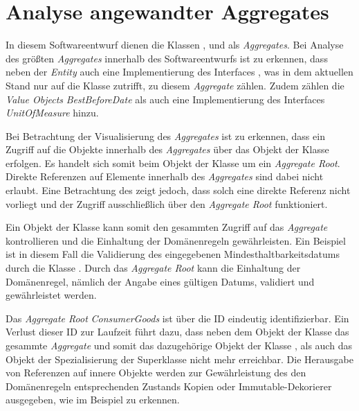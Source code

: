 \section{Analyse angewandter Aggregates}
\label{domaindrivendesign>aggregates}
In diesem Softwareentwurf dienen die Klassen \href{}{}, \href{}{} und \href{}{} als \textit{Aggregates}.
Bei Analyse des größten \textit{Aggregates} innerhalb des Softwareentwurfs ist zu erkennen, dass neben der \textit{Entity} \href{}{} auch eine Implementierung des Interfaces \href{}{}, was in dem aktuellen Stand nur auf die Klasse \href{}{} zutrifft, zu diesem \textit{Aggregate} zählen. 
Zudem zählen die \textit{Value Objects} \textit{BestBeforeDate} als auch eine Implementierung des Interfaces \textit{UnitOfMeasure} hinzu.


Bei Betrachtung der Visualisierung des \textit{Aggregates} ist zu erkennen, dass ein Zugriff auf die Objekte innerhalb des \textit{Aggregates} über das Objekt der Klasse \href{}{} erfolgen.
Es handelt sich somit beim Objekt der Klasse \href{}{} um ein \textit{Aggregate Root}.
Direkte Referenzen auf Elemente innerhalb des \textit{Aggregates} sind dabei nicht erlaubt.
Eine Betrachtung des \href{}{} zeigt jedoch, dass solch eine direkte Referenz nicht vorliegt und der Zugriff ausschließlich über den \textit{Aggregate Root} funktioniert.

Ein Objekt der Klasse \href{}{} kann somit den gesammten Zugriff auf das \textit{Aggregate} kontrollieren und die Einhaltung der Domänenregeln gewährleisten.
Ein Beispiel ist in diesem Fall die Validierung des eingegebenen Mindesthaltbarkeitsdatums durch die Klasse \href{}{}.
Durch das \textit{Aggregate Root} kann die Einhaltung der Domänenregel, nämlich der Angabe eines gültigen Datums, validiert und gewährleistet werden.

Das \textit{Aggregate Root} \textit{ConsumerGoods} ist über die ID \href{}{} eindeutig identifizierbar.
Ein Verlust dieser ID zur Laufzeit führt dazu, dass neben dem Objekt der Klasse \href{}{} das gesammte \textit{Aggregate} und somit das dazugehörige Objekt der Klasse \href{}{}, \href{}{} als auch das Objekt der Spezialisierung der Superklasse \href{}{} nicht mehr erreichbar.
Die Herausgabe von Referenzen auf innere Objekte werden zur Gewährleistung des den Domänenregeln entsprechenden Zustands Kopien oder Immutable-Dekorierer ausgegeben, wie im Beispiel \href{}{\code{}} zu erkennen.


